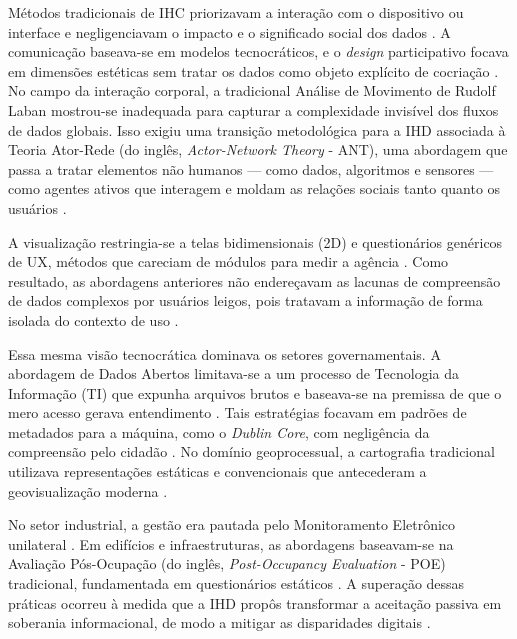 \documentclass[
	12pt,				%
	oneside,			%
	a4paper,			%
	english,			%
	brazil				%
	]{abntex2ppgsi}
\begin{document}
    Métodos tradicionais de IHC priorizavam a interação com o dispositivo ou interface e negligenciavam o impacto e o significado social dos dados \cite{Belizario2023Interacao}. A comunicação baseava-se em modelos tecnocráticos, e o \textit{design} participativo focava em dimensões estéticas sem tratar os dados como objeto explícito de cocriação \cite{ferreira2024connecting, seidelin2020foregrounding}. No campo da interação corporal, a tradicional Análise de Movimento de Rudolf Laban mostrou-se inadequada para capturar a complexidade invisível dos fluxos de dados globais. Isso exigiu uma transição metodológica para a IHD associada à Teoria Ator-Rede (do inglês, \textit{Actor-Network Theory} - ANT), uma abordagem que passa a tratar elementos não humanos — como dados, algoritmos e sensores — como agentes ativos que interagem e moldam as relações sociais tanto quanto os usuários \cite{Parviainen2016}.

    A visualização restringia-se a telas bidimensionais (2D) e questionários genéricos de UX, métodos que careciam de módulos para medir a agência \cite{DeKreij2024, Friedman2024, Burzio2024, Ranasinghe2023, Lee-Smith2023, Nelson2023, capeleti2023heuristic, Capeleti2023Usability, Victorelli2023Evaluating, Paredes2022317, Elhamdadi2022, Xia2021, Barreto2018}. Como resultado, as abordagens anteriores não endereçavam as lacunas de compreensão de dados complexos por usuários leigos, pois tratavam a informação de forma isolada do contexto de uso \cite{Belizario2023Interacao}.

    Essa mesma visão tecnocrática dominava os setores governamentais. A abordagem de Dados Abertos limitava-se a um processo de Tecnologia da Informação (TI) que expunha arquivos brutos e baseava-se na premissa de que o mero acesso gerava entendimento \cite{Cabitza2020131, JoseViterbo2020}. Tais estratégias focavam em padrões de metadados para a máquina, como o \textit{Dublin Core}, com negligência da compreensão pelo cidadão \cite{barcellos2022towards}. No domínio geoprocessual, a cartografia tradicional utilizava representações estáticas e convencionais que antecederam a geovisualização moderna \cite{Capeleti2024Human}. 

    No setor industrial, a gestão era pautada pelo Monitoramento Eletrônico unilateral \cite{calvetti2024human}. Em edifícios e infraestruturas, as abordagens baseavam-se na Avaliação Pós-Ocupação (do inglês, \textit{Post-Occupancy Evaluation} - POE) tradicional, fundamentada em questionários estáticos \cite{bavaresco2019technological}. A superação dessas práticas ocorreu à medida que a IHD propôs transformar a aceitação passiva em soberania informacional, de modo a mitigar as disparidades digitais \cite{Refat2023, hayes2024making, Jordan2023, Grace2023, Jandric2023, Stead2022}.
\end{document}
